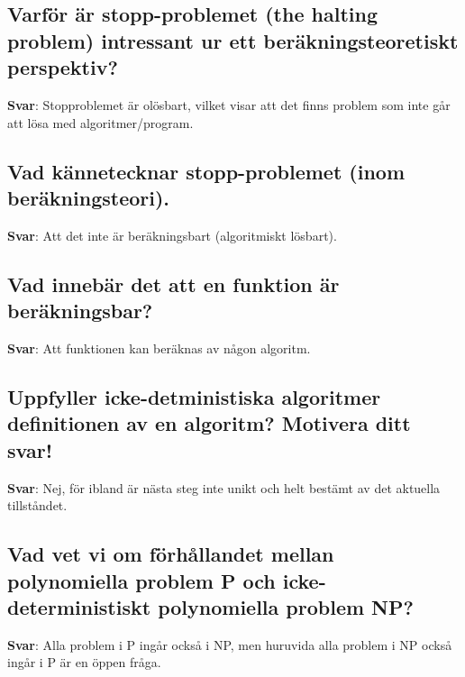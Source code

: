 \documentclass[a4paper,11pt,oneside]{article}
\begin{document}
\begin{sloppypar}
\subsection{Varf\"or \"ar stopp-problemet (the halting problem) intressant ur ett ber\"akningsteoretiskt perspektiv?}

\label{q:339:sa:sv:True}

\textbf{Svar}: Stopproblemet \"ar ol\"osbart, vilket visar att det finns problem som inte g\r{a}r att l\"osa med algoritmer/program.



\subsection{Vad k\"annetecknar stopp-problemet (inom ber\"akningsteori).}

\label{q:340:sa:sv:True}

\textbf{Svar}: Att det inte \"ar ber\"akningsbart (algoritmiskt l\"osbart).



\subsection{Vad inneb\"ar det att en funktion \"ar ber\"akningsbar?}

\label{q:341:sa:sv:True}

\textbf{Svar}: Att funktionen kan ber\"aknas av n\r{a}gon algoritm.



\subsection{Uppfyller icke-detministiska algoritmer definitionen av en algoritm? Motivera ditt svar!}

\label{q:342:sa:sv:True}

\textbf{Svar}: Nej, f\"or ibland \"ar n\"asta steg inte unikt och helt best\"amt av det aktuella tillst\r{a}ndet.



\subsection{Vad vet vi om f\"orh\r{a}llandet mellan polynomiella problem P och icke-deterministiskt polynomiella problem NP?}

\label{q:343:sa:sv:True}

\textbf{Svar}: Alla problem i P ing\r{a}r ocks\r{a} i NP, men huruvida alla problem i NP ocks\r{a} ing\r{a}r i P \"ar en \"oppen fr\r{a}ga.




\end{sloppypar}
\end{document}
